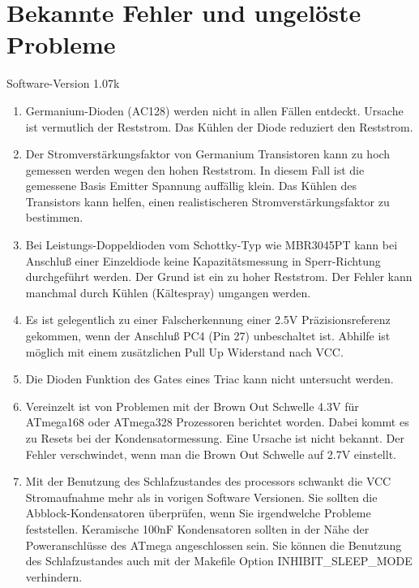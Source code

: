 
\chapter{Bekannte Fehler und ungelöste Probleme}
{\center Software-Version 1.07k}

\begin{enumerate}

\item Germanium-Dioden (AC128) werden nicht in allen Fällen entdeckt. Ursache ist vermutlich der Reststrom.
Das Kühlen der Diode reduziert den Reststrom.

\item Der Stromverstärkungsfaktor von Germanium Transistoren kann zu hoch gemessen werden wegen den hohen Reststrom.
In diesem Fall ist die gemessene Basis Emitter Spannung auffällig klein.
Das Kühlen des Transistors kann helfen, einen realistischeren Stromverstärkungsfaktor zu bestimmen.

\item Bei Leistungs-Doppeldioden vom Schottky-Typ wie MBR3045PT kann bei Anschluß einer Einzeldiode keine Kapazitätsmessung in Sperr-Richtung 
durchgeführt werden. Der Grund ist ein zu hoher Reststrom. Der Fehler kann manchmal durch Kühlen (Kältespray) umgangen werden.

\item Es ist gelegentlich zu einer Falscherkennung einer 2.5V Präzisionsreferenz gekommen, wenn der Anschluß PC4 (Pin 27) unbeschaltet ist.
Abhilfe ist möglich mit einem zusätzlichen Pull Up Widerstand nach VCC.

\item Die Dioden Funktion des Gates eines Triac kann nicht untersucht werden.

\item Vereinzelt ist von Problemen mit der Brown Out Schwelle 4.3V für ATmega168 oder ATmega328 Prozessoren berichtet worden.
Dabei kommt es zu Resets bei der Kondensatormessung.  Eine Ursache ist nicht bekannt.
Der Fehler verschwindet, wenn man die Brown Out Schwelle auf 2.7V einstellt.

\item Mit der Benutzung des Schlafzustandes des processors schwankt die VCC Stromaufnahme mehr als
in vorigen Software Versionen. Sie sollten die Abblock-Kondensatoren überprüfen, wenn Sie irgendwelche
Probleme feststellen. Keramische 100nF Kondensatoren sollten in der Nähe der Poweranschlüsse des ATmega
angeschlossen sein. Sie können die Benutzung des Schlafzustandes auch mit der Makefile Option
INHIBIT\_SLEEP\_MODE verhindern.

\end{enumerate}

